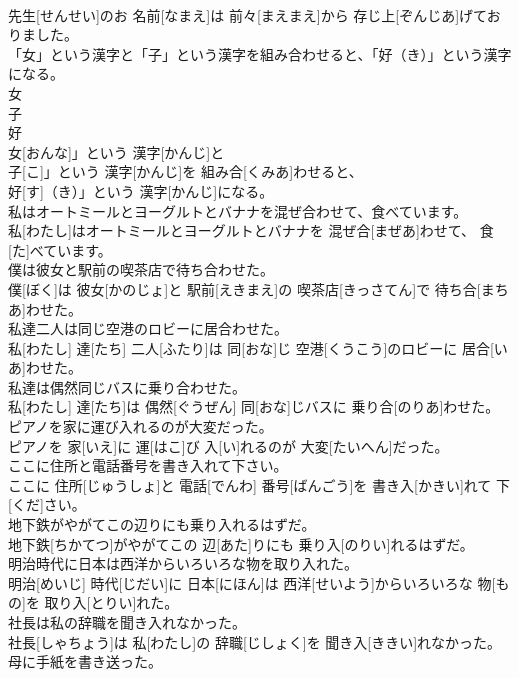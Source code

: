 \documentclass[8pt]{extreport}
\begin{document}
\begin{CJK}{UTF8}{min}
\\	先生[せんせい]のお 名前[なまえ]は 前々[まえまえ]から 存じ上[ぞんじあ]げておりました。
\\	「女」という漢字と「子」という漢字を組み合わせると、「好（き）」という漢字になる。	
\\	女 
\\	子 
\\	好 
\\	女[おんな]」という 漢字[かんじ]と
\\	子[こ]」という 漢字[かんじ]を 組み合[くみあ]わせると、
\\	好[す]（き）」という 漢字[かんじ]になる。
\\	私はオートミールとヨーグルトとバナナを混ぜ合わせて、食べています。	
\\	私[わたし]はオートミールとヨーグルトとバナナを 混ぜ合[まぜあ]わせて、 食[た]べています。
\\	僕は彼女と駅前の喫茶店で待ち合わせた。	
\\	僕[ぼく]は 彼女[かのじょ]と 駅前[えきまえ]の 喫茶店[きっさてん]で 待ち合[まちあ]わせた。
\\	私達二人は同じ空港のロビーに居合わせた。	
\\	私[わたし] 達[たち] 二人[ふたり]は 同[おな]じ 空港[くうこう]のロビーに 居合[いあ]わせた。
\\	私達は偶然同じバスに乗り合わせた。	
\\	私[わたし] 達[たち]は 偶然[ぐうぜん] 同[おな]じバスに 乗り合[のりあ]わせた。
\\	ピアノを家に運び入れるのが大変だった。	
\\	ピアノを 家[いえ]に 運[はこ]び 入[い]れるのが 大変[たいへん]だった。
\\	ここに住所と電話番号を書き入れて下さい。	
\\	ここに 住所[じゅうしょ]と 電話[でんわ] 番号[ばんごう]を 書き入[かきい]れて 下[くだ]さい。
\\	地下鉄がやがてこの辺りにも乗り入れるはずだ。	
\\	地下鉄[ちかてつ]がやがてこの 辺[あた]りにも 乗り入[のりい]れるはずだ。
\\	明治時代に日本は西洋からいろいろな物を取り入れた。	
\\	明治[めいじ] 時代[じだい]に 日本[にほん]は 西洋[せいよう]からいろいろな 物[もの]を 取り入[とりい]れた。
\\	社長は私の辞職を聞き入れなかった。	
\\	社長[しゃちょう]は 私[わたし]の 辞職[じしょく]を 聞き入[ききい]れなかった。
\\	母に手紙を書き送った。	

\end{CJK}
\end{document}
